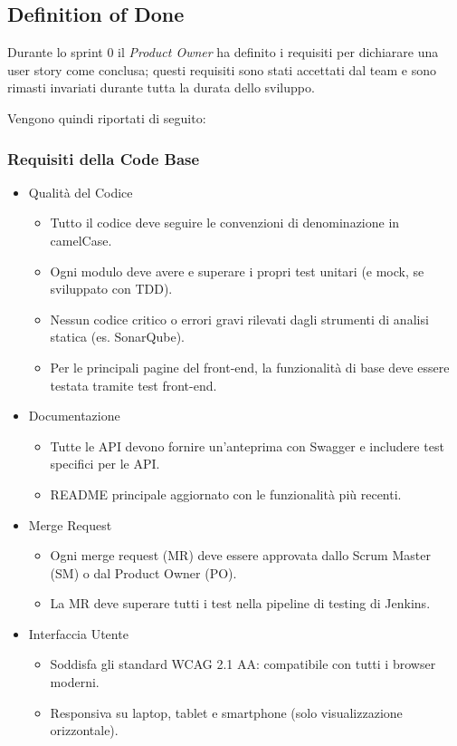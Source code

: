 \documentclass{article}
\begin{document}
\subsection{Definition of Done}
Durante lo sprint 0 il \textit{Product Owner} ha definito i requisiti per dichiarare una user story come conclusa;
questi requisiti sono stati accettati dal team e sono rimasti invariati durante tutta la durata dello sviluppo.

Vengono quindi riportati di seguito:

\subsubsection{Requisiti della Code Base}
\begin{itemize}
    \item Qualità del Codice
    \begin{itemize}
        \item Tutto il codice deve seguire le convenzioni di denominazione in camelCase.
        \item Ogni modulo deve avere e superare i propri test unitari (e mock, se sviluppato con TDD).
        \item Nessun codice critico o errori gravi rilevati dagli strumenti di analisi statica (es. SonarQube).
        \item Per le principali pagine del front-end, la funzionalità di base deve essere testata tramite test front-end.
    \end{itemize}

    \item Documentazione
    \begin{itemize}
        \item Tutte le API devono fornire un'anteprima con Swagger e includere test specifici per le API.
        \item README principale aggiornato con le funzionalità più recenti.
    \end{itemize}

    \item Merge Request
    \begin{itemize}
        \item Ogni merge request (MR) deve essere approvata dallo Scrum Master (SM) o dal Product Owner (PO).
        \item La MR deve superare tutti i test nella pipeline di testing di Jenkins.
    \end{itemize}

    \item Interfaccia Utente
    \begin{itemize}
        \item Soddisfa gli standard WCAG 2.1 AA: compatibile con tutti i browser moderni.
        \item Responsiva su laptop, tablet e smartphone (solo visualizzazione orizzontale).
    \end{itemize}


\end{itemize}
\end{document}
